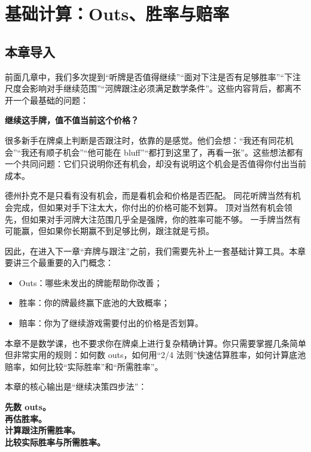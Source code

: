 \chapter{基础计算：Outs、胜率与赔率}

\section{本章导入}

前面几章中，我们多次提到“听牌是否值得继续”“面对下注是否有足够胜率”“下注尺度会影响对手继续范围”“河牌跟注必须满足数学条件”。这些内容背后，都离不开一个最基础的问题：

\begin{center}
\textbf{继续这手牌，值不值当前这个价格？}
\end{center}

很多新手在牌桌上判断是否跟注时，依靠的是感觉。他们会想：“我还有同花机会”“我还有顺子机会”“他可能在 bluff”“都打到这里了，再看一张”。这些想法都有一个共同问题：它们只说明你还有机会，却没有说明这个机会是否值得你付出当前成本。

德州扑克不是只看有没有机会，而是看机会和价格是否匹配。
同花听牌当然有机会完成，但如果对手下注太大，你付出的价格可能不划算。
顶对当然有机会领先，但如果对手河牌大注范围几乎全是强牌，你的胜率可能不够。
一手牌当然有可能赢，但如果你长期赢不到足够比例，跟注就是亏损。

因此，在进入下一章“弃牌与跟注”之前，我们需要先补上一套基础计算工具。本章要讲三个最重要的入门概念：

\begin{itemize}
\item Outs：哪些未发出的牌能帮助你改善；
\item 胜率：你的牌最终赢下底池的大致概率；
\item 赔率：你为了继续游戏需要付出的价格是否划算。
\end{itemize}

本章不是数学课，也不要求你在牌桌上进行复杂精确计算。你只需要掌握几条简单但非常实用的规则：如何数 outs，如何用“2/4 法则”快速估算胜率，如何计算底池赔率，如何比较“实际胜率”和“所需胜率”。

本章的核心输出是“继续决策四步法”：

\begin{center}
\textbf{先数 outs。\\
再估胜率。\\
计算跟注所需胜率。\\
比较实际胜率与所需胜率。}
\end{center}

